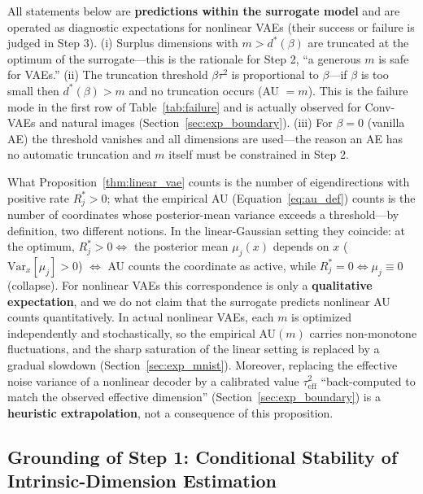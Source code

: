 \documentclass[make,article,submit,pdftex,moreauthors]{Definitions/mdpi}
\newcommand{\dstar}{d^{*}(\beta)}
\begin{document}
\begin{Remark}\label{rem:implication}
All statements below are \textbf{predictions within the surrogate model}
and are operated as diagnostic expectations for nonlinear VAEs (their
success or failure is judged in Step 3).
(i) Surplus dimensions with $m > \dstar$ are truncated at the optimum of
the surrogate---this is the rationale for Step 2, ``a generous $m$ is safe
for VAEs.''
(ii) The truncation threshold $\beta\tau^2$ is proportional to $\beta$---if
$\beta$ is too small then $\dstar > m$ and no truncation occurs
(AU $= m$).
This is the failure mode in the first row of Table~\ref{tab:failure} and is
actually observed for Conv-VAEs and natural images
(Section~\ref{sec:exp_boundary}).
(iii) For $\beta = 0$ (vanilla AE) the threshold vanishes and all
dimensions are used---the reason an AE has no automatic truncation and $m$
itself must be constrained in Step 2.
\end{Remark}

\begin{Remark}\label{rem:bridge}
What Proposition~\ref{thm:linear_vae} counts is the number of
eigendirections with positive rate $R_j^* > 0$; what the empirical AU
(Equation~\eqref{eq:au_def}) counts is the number of coordinates whose
posterior-mean variance exceeds a threshold---by definition, two different
notions.
In the linear-Gaussian setting they coincide: at the optimum,
$R_j^* > 0 \iff$ the posterior mean $\mu_j(x)$ depends on $x$
($\mathrm{Var}_x[\mu_j] > 0$) $\iff$ AU counts the coordinate as active,
while $R_j^* = 0 \iff \mu_j \equiv 0$ (collapse).
For nonlinear VAEs this correspondence is only a \textbf{qualitative
expectation}, and we do not claim that the surrogate predicts nonlinear AU
counts quantitatively.
In actual nonlinear VAEs, each $m$ is optimized independently and
stochastically, so the empirical AU$(m)$ carries non-monotone fluctuations,
and the sharp saturation of the linear setting is replaced by a gradual
slowdown (Section~\ref{sec:exp_mnist}).
Moreover, replacing the effective noise variance of a nonlinear decoder by a
calibrated value $\tau^2_{\mathrm{eff}}$ ``back-computed to match the
observed effective dimension'' (Section~\ref{sec:exp_boundary}) is a
\textbf{heuristic extrapolation}, not a consequence of this proposition.
\end{Remark}

\subsection{Grounding of Step 1: Conditional Stability of Intrinsic-Dimension Estimation}\label{sec:theory_twonn}
\end{document}
